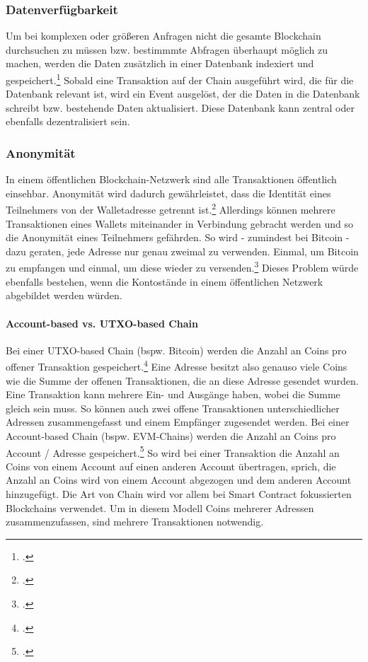 \documentclass[12pt, a4paper]{article}
\begin{document}
{\subsubsection{Datenverfügbarkeit}
\label{sec:Datenverfügbarkeit}
Um bei komplexen oder größeren Anfragen nicht die gesamte Blockchain durchsuchen zu müssen bzw. bestimmmte Abfragen überhaupt möglich zu machen, werden die Daten zusätzlich in einer Datenbank indexiert und gespeichert.\footcites[Vgl. hierzu und im Folgenden][]{w32}[]{w33}
Sobald eine Transaktion auf der Chain ausgeführt wird, die für die Datenbank relevant ist, wird ein Event ausgelöst, der die Daten in die Datenbank schreibt bzw. bestehende Daten aktualisiert.
Diese Datenbank kann zentral oder ebenfalls dezentralisiert sein.
\subsubsection{Anonymität}
\label{sec:Anonymität}
In einem öffentlichen Blockchain-Netzwerk sind alle Transaktionen öffentlich einsehbar.
Anonymität wird dadurch gewährleistet, dass die Identität eines Teilnehmers von der Walletadresse getrennt ist.\footcite[Vgl.][6]{q4}
Allerdings können mehrere Transaktionen eines Wallets miteinander in Verbindung gebracht werden und so die Anonymität eines Teilnehmers gefährden. So wird - zumindest bei Bitcoin - dazu geraten, jede Adresse nur genau zweimal zu verwenden. Einmal, um Bitcoin zu empfangen und einmal, um diese wieder zu versenden.\footcite[Vgl.][]{w15}
Dieses Problem würde ebenfalls bestehen, wenn die Kontostände in einem öffentlichen Netzwerk abgebildet werden würden.

\paragraph{Account-based vs. UTXO-based Chain}
\label{sec:definition-account-based-vs-utxo-based-chain}
\noindent
Bei einer UTXO-based Chain (bspw. Bitcoin) werden die Anzahl an Coins pro offener Transaktion gespeichert.\footcite[Vgl. hierzu und zum Folgenden sowie weiterführend][S. 182 ff\adddot]{q5}
Eine Adresse besitzt also genauso viele Coins wie die Summe der offenen Transaktionen, die an diese Adresse gesendet wurden.
Eine Transaktion kann mehrere Ein- und Ausgänge haben, wobei die Summe gleich sein muss.
So können auch zwei offene Transaktionen unterschiedlicher Adressen zusammengefasst und einem Empfänger zugesendet werden.
\bigbreak
\noindent
Bei einer Account-based Chain (bspw. EVM-Chains) werden die Anzahl an Coins pro Account / Adresse gespeichert.\footcite[Vgl. hierzu und zum Folgenden][]{w16} 
So wird bei einer Transaktion die Anzahl an Coins von einem Account auf einen anderen Account übertragen, sprich, die Anzahl an Coins wird von einem Account abgezogen und dem anderen Account hinzugefügt.
Die Art von Chain wird vor allem bei Smart Contract fokussierten Blockchains verwendet.
Um in diesem Modell Coins mehrerer Adressen zusammenzufassen, sind mehrere Transaktionen notwendig.

}
\end{document}
